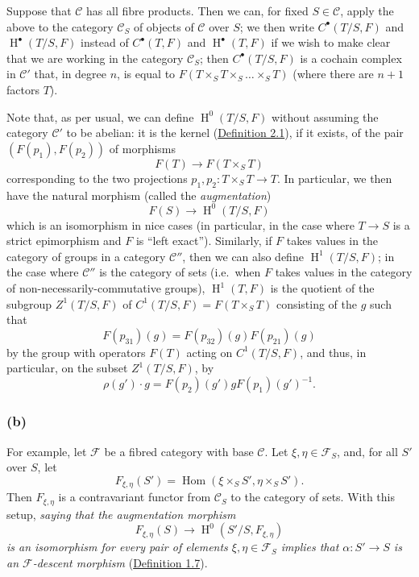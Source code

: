 \documentclass{article}
\newcommand{\oldpage}[1]{\marginpar{\footnotesize$\Big\vert$ \textit{p.~#1}}}
\theoremstyle{definition}
\theoremstyle{definition}
\theoremstyle{definition}
\theoremstyle{definition}
\theoremstyle{remark}
\begin{document}
Suppose that \({\mathcal{C}}\) has all fibre products.
Then we can, for fixed \(S\in{\mathcal{C}}\), apply the above to the category \({\mathcal{C}}_S\) of objects of \({\mathcal{C}}\) over \(S\);
we then write \(C^\bullet(T/S,F)\) and \(\operatorname{H}^\bullet(T/S,F)\) instead of \(C^\bullet(T,F)\) and \(\operatorname{H}^\bullet(T,F)\) if we wish to make clear that we are working in the category \({\mathcal{C}}_S\);
\oldpage{190-13}then \(C^\bullet(T/S,F)\) is a cochain complex in \({\mathcal{C}}'\) that, in degree \(n\), is equal to \(F(T\times_S T\times_S\ldots\times_S T)\) (where there are \(n+1\) factors \(T\)).

Note that, as per usual, we can define \(\operatorname{H}^0(T/S,F)\) without assuming the category \({\mathcal{C}}'\) to be abelian:
it is the kernel (\protect\hyperlink{fga-3-i-section-A.2-definition-2.1}{Definition 2.1}), if it exists, of the pair \((F(p_1),F(p_2))\) of morphisms
\[
  F(T) \to F(T\times_S T)
\]
corresponding to the two projections \(p_1,p_2\colon T\times_S T\to T\).
In particular, we then have the natural morphism (called the \emph{augmentation})
\[
  F(S) \to \operatorname{H}^0(T/S,F)
\]
which is an isomorphism in nice cases (in particular, in the case where \(T\to S\) is a strict epimorphism and \(F\) is ``left exact'').
Similarly, if \(F\) takes values in the category of groups in a category \({\mathcal{C}}''\), then we can also define \(\operatorname{H}^1(T/S,F)\);
in the case where \({\mathcal{C}}''\) is the category of sets (i.e.~when \(F\) takes values in the category of non-necessarily-commutative groups), \(\operatorname{H}^1(T,F)\) is the quotient of the subgroup \(Z^1(T/S,F)\) of \(C^1(T/S,F) = F(T\times_S T)\) consisting of the \(g\) such that
\[
  F(p_{31})(g) = F(p_{32})(g) F(p_{21})(g)
\]
by the group with operators \(F(T)\) acting on \(C^1(T/S,F)\), and thus, in particular, on the subset \(Z^1(T/S,F)\), by
\[
  \rho(g')\cdot g = F(p_2)(g') g F(p_1)(g')^{-1}.
\]

\hypertarget{fga-3-i-section-A.4.b}{%
\subsubsection{(b)}\label{fga-3-i-section-A.4.b}}

For example, let \({\mathcal{F}}\) be a fibred category with base \({\mathcal{C}}\).
Let \(\xi,\eta\in{\mathcal{F}}_S\), and, for all \(S'\) over \(S\), let
\[
  F_{\xi,\eta}(S') = \operatorname{Hom}(\xi\times_S S', \eta\times_S S').
\]
Then \(F_{\xi,\eta}\) is a contravariant functor from \({\mathcal{C}}_S\) to the category of sets.
With this setup, \emph{saying that the augmentation morphism}
\[
  F_{\xi,\eta}(S) \to \operatorname{H}^0(S'/S,F_{\xi,\eta})
\]
\emph{is an isomorphism for every pair of elements \(\xi,\eta\in{\mathcal{F}}_S\) implies that \(\alpha\colon S'\to S\) is an \({\mathcal{F}}\)-descent morphism} (\protect\hyperlink{fga-3-i-section-A.1-definition-1.7}{Definition 1.7}).
\end{document}
